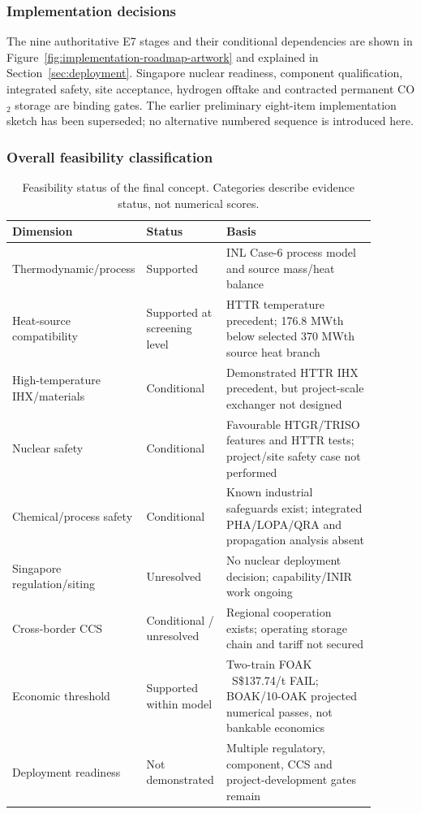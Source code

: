 \subsubsection{Implementation decisions}
The nine authoritative E7 stages and their conditional dependencies are shown in Figure~\ref{fig:implementation-roadmap-artwork} and explained in Section~\ref{sec:deployment}. Singapore nuclear readiness, component qualification, integrated safety, site acceptance, hydrogen offtake and contracted permanent CO$_2$ storage are binding gates. The earlier preliminary eight-item implementation sketch has been superseded; no alternative numbered sequence is introduced here.

\subsubsection{Overall feasibility classification}
\begin{table}[htbp]\centering\small
\caption{Feasibility status of the final concept. Categories describe evidence status, not numerical scores.}
\begin{tabular}{p{0.25\linewidth}p{0.22\linewidth}p{0.42\linewidth}}
\toprule Dimension & Status & Basis \\ \midrule
Thermodynamic/process & Supported & INL Case-6 process model and source mass/heat balance \\
Heat-source compatibility & Supported at screening level & HTTR temperature precedent; 176.8 MWth below selected 370 MWth source heat branch \\
High-temperature IHX/materials & Conditional & Demonstrated HTTR IHX precedent, but project-scale exchanger not designed \\
Nuclear safety & Conditional & Favourable HTGR/TRISO features and HTTR tests; project/site safety case not performed \\
Chemical/process safety & Conditional & Known industrial safeguards exist; integrated PHA/LOPA/QRA and propagation analysis absent \\
Singapore regulation/siting & Unresolved & No nuclear deployment decision; capability/INIR work ongoing \\
Cross-border CCS & Conditional / unresolved & Regional cooperation exists; operating storage chain and tariff not secured \\
Economic threshold & Supported within model & Two-train FOAK ~S\$137.74/t FAIL; BOAK/10-OAK projected numerical passes, not bankable economics \\
Deployment readiness & Not demonstrated & Multiple regulatory, component, CCS and project-development gates remain \\
\bottomrule\end{tabular}\end{table}

